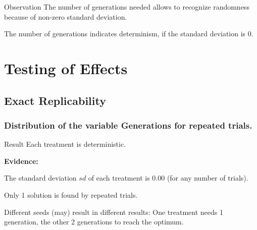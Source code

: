 \documentclass[18pt,c]{beamer}
\makeatletter
\let\beamer@writeslidentry@miniframeson=\beamer@writeslidentry
\newcommand*{\miniframeson}{\let\beamer@writeslidentry=\beamer@writeslidentry@miniframeson}
\makeatother
\begin{document}
\begin{frame}
\vspace*{2mm}
\begin{block}{
Observation
}
The number of generations needed allows to recognize randomness
because of non-zero standard deviation.
 
The number of generations indicates determinism,
if the standard deviation is $0$.
\end{block}
\end{frame}%
\miniframeson
\section{Testing of Effects}
\miniframeson
\subsection{Exact Replicability}
 \begin{frame}
 \fontsize{8pt}{9pt}\selectfont
 \frametitle{ Distribution of the variable Generations for repeated trials. }

 \label{ExpCStatsTable003.tex}  
 \end{frame}

\begin{frame}
\vspace*{2mm}
\begin{block}{
Result
}
Each treatment is deterministic.
 
{\bf Evidence:}
 
The standard deviation $sd$ of each treatment is $0.00$
(for any number of trials).
 
Only 1 solution is found by repeated trials.
 
Different seeds (may) result in different results:
One treatment needs 1 generation, the other 2 generations to reach the optimum.
\end{block}
\end{frame}%
\miniframeson
\end{document}
